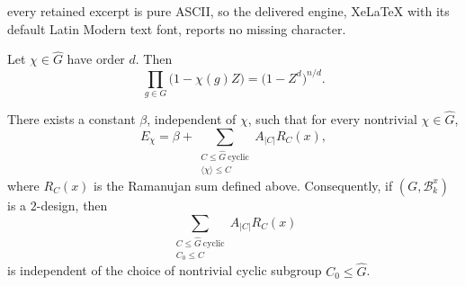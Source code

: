 \documentclass[10pt,a4paper]{amsart}
\newcommand{\C}{\mathbb C}
\newcommand{\cB}{\mathcal B}
\begin{document}
every retained excerpt is pure ASCII, so the delivered engine, XeLaTeX with its default Latin Modern text font, reports no missing character.
\begin{lemma}
	\label{lem:product-identity}
	Let \(\chi\in\widehat G\) have order \(d\).  Then
	\[
	\prod_{g\in G}\bigl(1-\chi(g)Z\bigr)
	=
	\bigl(1-Z^d\bigr)^{n/d}.
	\]
\end{lemma}

\begin{theorem}\label{thm:energy-expansion}
	There exists a constant \(\beta\), independent of \(\chi\), such that for every nontrivial \(\chi\in\widehat G\),
	\begin{equation}
	E_\chi
	=
	\beta+
	\sum_{\substack{C\le\widehat G\ \mathrm{cyclic}\\
		\langle\chi\rangle\le C}}
	A_{|C|}R_C(x),
	\end{equation}
	where $R_C(x)$ is the Ramanujan sum defined above. Consequently, if $(G,\cB_k^x)$ is a $2$-design, then
	\begin{equation}\label{eq:energy-system}
	\sum_{\substack{C\le\widehat G\ \mathrm{cyclic}\\C_0\le C}}A_{|C|}R_C(x)
	\end{equation}
	is independent of the choice of nontrivial cyclic subgroup $C_0\le\widehat G$.
\end{theorem}
\end{document}
